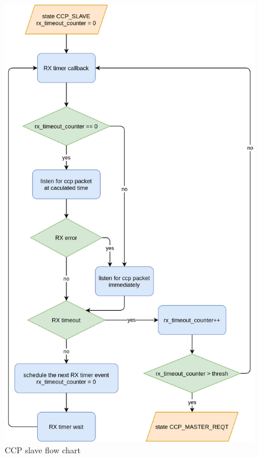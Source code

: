 \documentclass[\main/main.tex]{subfiles}
\begin{document}
\begin{figure}[H]
    \begin{center}
        \includegraphics[scale=0.35]{ccp_slave_flow_chart.png}
    \end{center}
    \caption{CCP slave flow chart}
    \label{fig:ccp_slave_flow_chart}
\end{figure}

\end{document}
